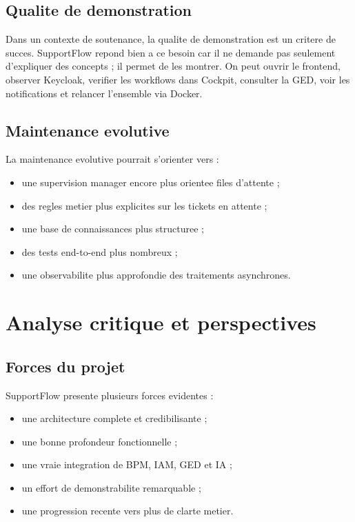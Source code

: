 \documentclass[12pt,a4paper,oneside]{report}
\begin{document}
\section{Qualite de demonstration}

Dans un contexte de soutenance, la qualite de demonstration est un critere de succes. SupportFlow repond bien a ce besoin car il ne demande pas seulement d'expliquer des concepts ; il permet de les montrer. On peut ouvrir le frontend, observer Keycloak, verifier les workflows dans Cockpit, consulter la GED, voir les notifications et relancer l'ensemble via Docker.

\section{Maintenance evolutive}

La maintenance evolutive pourrait s'orienter vers :

\begin{itemize}[leftmargin=1.2cm]
  \item une supervision manager encore plus orientee files d'attente ;
  \item des regles metier plus explicites sur les tickets en attente ;
  \item une base de connaissances plus structuree ;
  \item des tests end-to-end plus nombreux ;
  \item une observabilite plus approfondie des traitements asynchrones.
\end{itemize}

\chapter{Analyse critique et perspectives}

\section{Forces du projet}

SupportFlow presente plusieurs forces evidentes :

\begin{itemize}[leftmargin=1.2cm]
  \item une architecture complete et credibilisante ;
  \item une bonne profondeur fonctionnelle ;
  \item une vraie integration de BPM, IAM, GED et IA ;
  \item un effort de demonstrabilite remarquable ;
  \item une progression recente vers plus de clarte metier.
\end{itemize}
\end{document}

